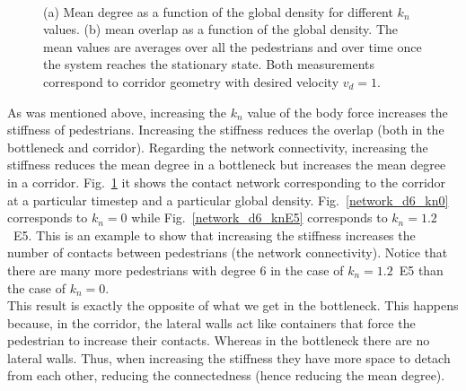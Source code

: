 \documentclass[preprint,12pt]{elsarticle}
\begin{document}
\begin{figure}[!htbp]
\centering
    \ 
    \\
\caption[width=0.47\columnwidth]{(a) Mean degree as a function of the global density for different $k_n$ values. (b) mean overlap as a function of the global density. The mean values are averages over all the pedestrians and over time once the system reaches the stationary state. Both measurements correspond to corridor geometry with desired velocity $v_d=1$.}
\label{network_corridor}
\end{figure}

As was mentioned above, increasing the $k_n$ value of the body force increases the stiffness of pedestrians. Increasing the stiffness reduces the overlap (both in the bottleneck and corridor). Regarding the network connectivity, increasing the stiffness reduces the mean degree in a bottleneck but increases the mean degree in a corridor. Fig.~\ref{network_corridor} it shows the contact network corresponding to the corridor at a particular timestep and a particular global density. Fig.~\ref{network_d6_kn0} corresponds to $k_n=0$ while Fig.~\ref{network_d6_knE5} corresponds to $k_n=1.2$~E5. This is an example to show that increasing the stiffness increases the number of contacts between pedestrians (the network connectivity). Notice that there are many more pedestrians with degree 6 in the case of $k_n=1.2$~E5 than the case of $k_n=0$. \\

This result is exactly the opposite of what we get in the bottleneck. This happens because, in the corridor, the lateral walls act like containers that force the pedestrian to increase their contacts. Whereas in the bottleneck there are no lateral walls. Thus, when increasing the stiffness they have more space to detach from each other, reducing the connectedness (hence reducing the mean degree). \\
\end{document}
